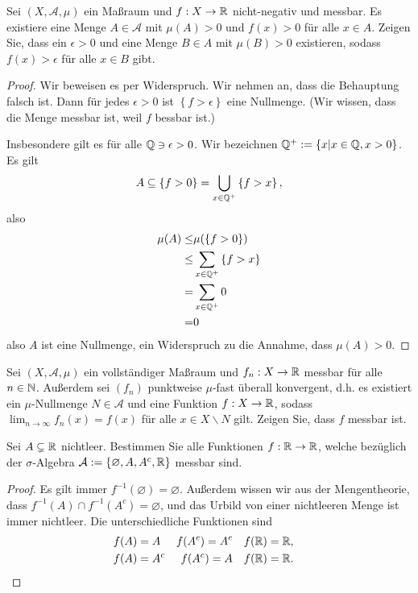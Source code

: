 
\begin{Problem}
	Sei $(X,\mathcal{A},\mu)$ ein Maßraum und $f:X\to \mathbb{R}$ nicht-negativ und messbar. Es existiere eine Menge $A\in \mathcal{A}$ mit $\mu(A)>0$ und $f(x)>0$ f\"{u}r alle $x\in A$. Zeigen Sie, dass ein $\epsilon>0$ und eine Menge $B\in A$ mit $\mu(B)>0$ existieren, sodass $f(x)>\epsilon$ f\"{u}r alle $x\in B$ gibt.
\end{Problem}

\begin{proof}
	Wir beweisen es per Widerspruch. Wir nehmen an, dass die Behauptung falsch ist. Dann f\"{u}r jedes $\epsilon>0$ ist $\left\{ f>\epsilon \right\} $ eine Nullmenge. (Wir wissen, dass die Menge messbar ist, weil $f$ bessbar ist.)

	Insbesondere gilt es f\"{u}r alle $\mathbb{Q}\ni \epsilon >0$. Wir bezeichnen $\mathbb{Q}^+:=\left\{ x|x\in \mathbb{Q}, x>0 \right\} $. Es gilt
	\[
	A\subseteq \left\{ f>0 \right\} =\bigcup_{x\in \mathbb{Q}^+} \left\{ f>x \right\} 
,\] 
also
\begin{align*}
	\mu(A)\le& \mu(\left\{ f>0 \right\} )\\
	\le& \sum_{x\in \mathbb{Q}^+} \left\{ f>x \right\} \\
	=& \sum_{x\in \mathbb{Q}^+} 0\\
	=& 0
\end{align*}
also $A$ ist eine Nullmenge, ein Widerspruch zu die Annahme, dass $\mu(A)>0$.
\end{proof}
\begin{Problem}
	Sei $(X,\mathcal{A},\mu)$ ein vollst\"{a}ndiger Maßraum und $f_n:X\to \mathbb{R}$ messbar f\"{u}r alle $n\in \mathbb{N}$. Außerdem sei $(f_n)$ punktweise $\mu$-fast überall konvergent, d.h. es existiert ein $\mu$-Nullmenge $N\in \mathcal{A}$ und eine Funktion $f:X\to \mathbb{R}$, sodass $\lim_{n \to \infty} f_n(x)=f(x)$ f\"{u}r alle $x\in X\backslash N$ gilt. Zeigen Sie, dass $f$ messbar ist.
\end{Problem}
\begin{Problem}
	Sei $A\subsetneq \mathbb{R}$ nichtleer. Bestimmen Sie alle Funktionen $f:\mathbb{R}\to \mathbb{R}$, welche bezüglich der $\sigma$-Algebra $\mathcal{A}:=\left\{ \varnothing, A,A^c, \mathbb{R} \right\} $ messbar sind.
\end{Problem}
\begin{proof}
	Es gilt immer $f^{-1}(\varnothing)=\varnothing$. Außerdem wissen wir aus der Mengentheorie, dass $f^{-1}(A)\cap f^{-1}(A^c)=\varnothing$, und das Urbild von einer nichtleeren Menge ist immer nichtleer. Die unterschiedliche Funktionen sind
	\begin{align*}
		& f(A)=A & f(A^c)=A^c & & f(\mathbb{R})=\mathbb{R}, \\
		& f(A)=A^c & f(A^c)=A & & f(\mathbb{R})=\mathbb{R}. & \qedhere
	\end{align*}
\end{proof}
